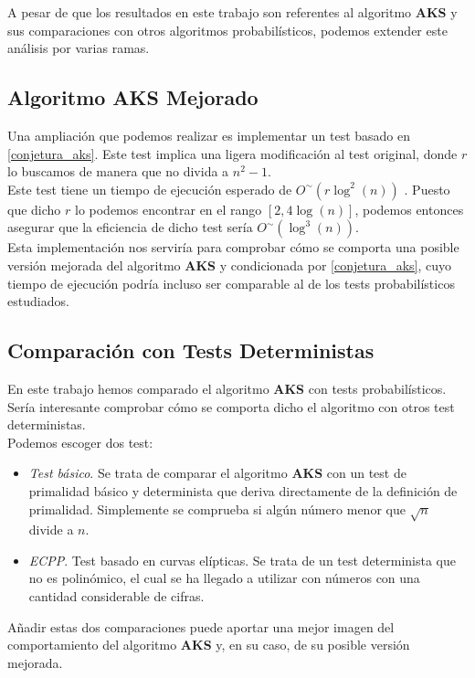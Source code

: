 A pesar de que los resultados en este trabajo son referentes al algoritmo \textbf{AKS} y sus comparaciones con otros algoritmos probabilísticos, podemos extender este análisis por varias ramas.

\subsection{Algoritmo AKS Mejorado}

Una ampliación que podemos realizar es implementar un test basado en \autoref{conjetura_aks}. Este test implica una ligera modificación al test original, donde $r$ lo buscamos de manera que no divida a $n^2 - 1$.\\

Este test tiene un tiempo de ejecución esperado de $O^\sim(r\log^2(n))$ \cite{primes_is_in_p}. Puesto que dicho $r$ lo podemos encontrar en el rango $[2, 4\log(n)]$, podemos entonces asegurar que la eficiencia de dicho test sería $O^\sim(\log^3(n))$.\\

Esta implementación nos serviría para comprobar cómo se comporta una posible versión mejorada del algoritmo \textbf{AKS} y condicionada por \autoref{conjetura_aks}, cuyo tiempo de ejecución podría incluso ser comparable al de los tests probabilísticos estudiados.

\subsection{Comparación con Tests Deterministas}

En este trabajo hemos comparado el algoritmo \textbf{AKS} con tests probabilísticos. Sería interesante comprobar cómo se comporta dicho el algoritmo con otros test deterministas.\\

Podemos escoger dos test:

\begin{itemize}
	\item \textit{Test básico}. Se trata de comparar el algoritmo \textbf{AKS} con un test de primalidad básico y determinista que deriva directamente de la definición de primalidad. Simplemente se comprueba si algún número menor que $\sqrt{n}$ divide a $n$.
	
	\item \textit{ECPP}. Test basado en curvas elípticas. Se trata de un test determinista que no es polinómico, el cual se ha llegado a utilizar con números con una cantidad considerable de cifras.
\end{itemize}

Añadir estas dos comparaciones puede aportar una mejor imagen del comportamiento del algoritmo \textbf{AKS} y, en su caso, de su posible versión mejorada.

\endinput
